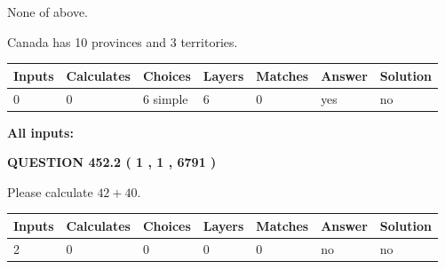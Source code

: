 \documentclass[12pt]{article}
\begin{document}
 
 None of above.
 
 
\noindent{}
 
 
Canada has 10  provinces and 3 territories.
 
 
\noindent{}
 
 
   
   
   
   
\noindent\begin{tabular}{|l|l|l|l|l|l|l|}
 \hline
Inputs & Calculates & Choices & Layers & Matches & Answer & Solution \\ \hline
 0  & 
 0  & 
 6
  simple  
  & 
 6  & 
 0  & 
  yes & 
  no 
  \\ \hline
 \end{tabular}
   
   
   
   
\noindent{}
   
   
   
   
\noindent\vspace{0.1in}\hspace{-0.08in} {\textbf{\Large{All inputs: }}}
   
   
  
\vspace{0.2in}
  
{\textbf{\Large{QUESTION
452.2 
 ( 1 , 1 , 6791 )
}}}
  
  
 
Please calculate $ %
42 +  %
40 $.
 
 
   
   
   
   
\noindent\begin{tabular}{|l|l|l|l|l|l|l|}
 \hline
Inputs & Calculates & Choices & Layers & Matches & Answer & Solution \\ \hline
 2  & 
 0  & 
 0
  & 
 0  & 
 0  & 
  no & 
  no 
  \\ \hline
 \end{tabular}
   
   
   
   
\noindent{}
   
\end{document}
